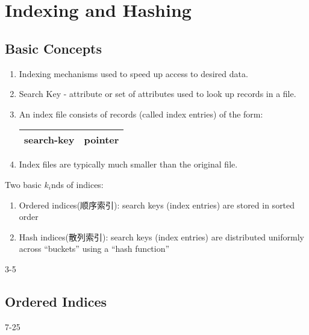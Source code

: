 \newpage
\section{Indexing and Hashing}

\subsection{Basic Concepts}
\begin{enumerate}\small
    \item Indexing mechanisms used to speed up access to desired data.
    \item Search Key - attribute or set of attributes used to look up records in a file.
    \item An index file consists of records (called index entries) of the form: 
    \begin{table}[H]
        \centering
        \begin{tabular}[c]{|c|c|}\hline
            search-key & pointer \\ \hline
        \end{tabular}
    \end{table}
    \item Index files are typically much smaller than the original file.
\end{enumerate}

Two basic $k_i$nds of indices:
\begin{enumerate}
    \item Ordered indices(顺序索引): search keys (index entries) are stored in sorted
    order
    \item Hash indices(散列索引): search keys (index entries) are distributed uniformly across ``buckets'' using a ``hash function''
\end{enumerate}
 3-5

\subsection{Ordered Indices} 7-25


